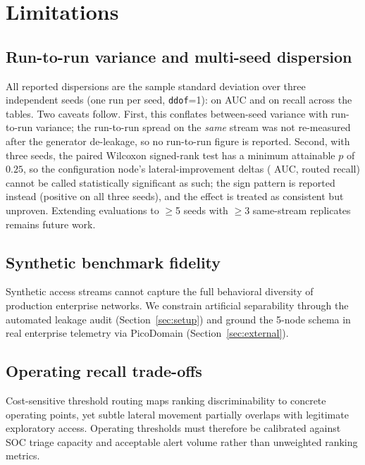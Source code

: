 \section{Limitations}
\label{sec:limits}

\subsection{Run-to-run variance and multi-seed dispersion}

All reported dispersions are the sample standard deviation over three independent
seeds (one run per seed, \texttt{ddof}=1): \PublishedSdAuc{} on AUC and \PublishedSdRecall{} on
recall across the tables. Two caveats follow. First, this conflates between-seed variance with
run-to-run variance; the run-to-run spread on the \emph{same} stream was not re-measured after
the generator de-leakage, so no run-to-run figure is reported. Second, with three seeds, the
paired Wilcoxon signed-rank test has a minimum attainable $p$ of $0.25$, so the configuration
node's lateral-improvement deltas (\BlatAucD{} AUC, \BlatRecD{} routed recall) cannot be called
statistically significant as such; the sign pattern is reported instead (positive on
all three seeds), and the effect is treated as consistent but unproven. Extending evaluations to $\geq$5
seeds with $\geq$3 same-stream replicates remains future work.

\subsection{Synthetic benchmark fidelity}

Synthetic access streams cannot capture the full behavioral diversity of production
enterprise networks. We constrain artificial separability through the automated
leakage audit (Section~\ref{sec:setup}) and ground the 5-node schema in real enterprise
telemetry via PicoDomain (Section~\ref{sec:external}).

\subsection{Operating recall trade-offs}

Cost-sensitive threshold routing maps ranking discriminability to concrete operating points,
yet subtle lateral movement partially overlaps with legitimate exploratory access.
Operating thresholds must therefore be calibrated against SOC triage capacity and
acceptable alert volume rather than unweighted ranking metrics.


